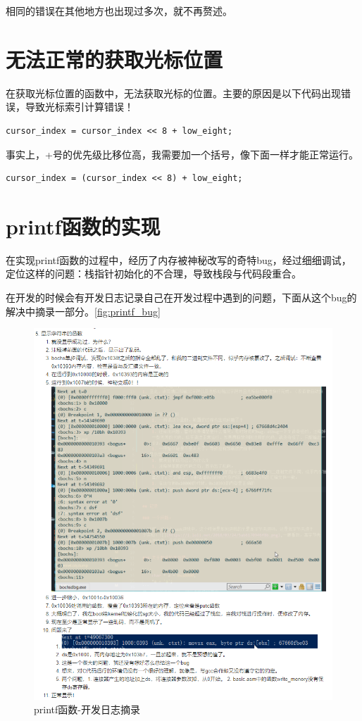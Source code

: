 \documentclass[forprint]{WHUBachelor}
\begin{document}
相同的错误在其他地方也出现过多次，就不再赘述。

\section{无法正常的获取光标位置}

在获取光标位置的函数中，无法获取光标的位置。主要的原因是以下代码出现错误，导致光标索引计算错误！

\begin{lstlisting}[language={[x86masm]Assembler}] 
  cursor_index = cursor_index << 8 + low_eight;
\end{lstlisting}
事实上，+号的优先级比移位高，我需要加一个括号，像下面一样才能正常运行。
\begin{lstlisting}[language={[x86masm]Assembler}] 
  cursor_index = (cursor_index << 8) + low_eight;
\end{lstlisting}

\section{printf函数的实现}

在实现printf函数的过程中，经历了内存被神秘改写的奇特bug，经过细细调试，定位这样的问题：栈指针初始化的不合理，导致栈段与代码段重合。

在开发的时候会有开发日志记录自己在开发过程中遇到的问题，下面从这个bug的解决中摘录一部分。\autoref{fig:printf_bug}

\begin{figure}[htp]
  \centering
  \includegraphics[width=18cm]{"./figure/printf_bug.png"}
  \caption{printf函数-开发日志摘录}
  \label{fig:printf_bug}
\end{figure}
\end{document}
